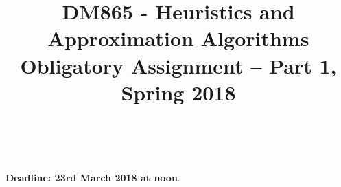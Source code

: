 \documentclass[a4paper,10pt]{article}
\title{\begin{flushleft}
DM865 - Heuristics and Approximation Algorithms\\[0.3cm]
{\Large Obligatory Assignment -- Part 1, Spring 2018 %
}
\\
\hrulefill
\\[-1.8cm]
\end{flushleft}
}
\author{}
\date{}
\begin{document}
\maketitle

\begin{center}
{\textbf{Deadline: 23rd March 2018 at noon}.}
\end{center}
\bigskip









\end{document}

